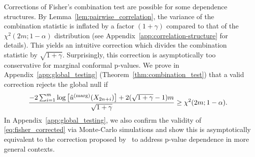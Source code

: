 \documentclass[11pt]{article}
\def\marg{\textnormal{(marg)}}
\begin{document}
Corrections of Fisher's combination test are possible for some dependence structures. 
By Lemma~\ref{lem:pairwise_correlation}, the variance of the combination statistic is inflated by a factor $(1 + \gamma)$ compared to that of the $\chi^2(2m; 1 - \alpha)$ distribution (see Appendix~\ref{app:correlation-structure} for details). This yields an intuitive correction which divides the combination statistic by $\sqrt{1 + \gamma}$. Surprisingly, this correction is asymptotically too conservative for marginal conformal p-values. 
We prove in Appendix~\ref{app:global_testing} (Theorem~\ref{thm:combination_test}) that a valid correction rejects the global null if 
\begin{equation}\label{eq:fisher_corrected}
\frac{-2 \sum_{i=1}^{m} \log \left[\hat{u}^\marg(X_{2n+i})\right] + 2(\sqrt{1 + \gamma} - 1)m}{\sqrt{1 + \gamma}}\ge \chi^2(2m; 1 - \alpha).
\end{equation}
In Appendix~\ref{app:global_testing}, we also confirm the validity of \eqref{eq:fisher_corrected} via Monte-Carlo simulations and show this is asymptotically equivalent to the correction proposed by~\cite{brown1975400, kost2002combining} to address p-value dependence in more general contexts.


\end{document}
